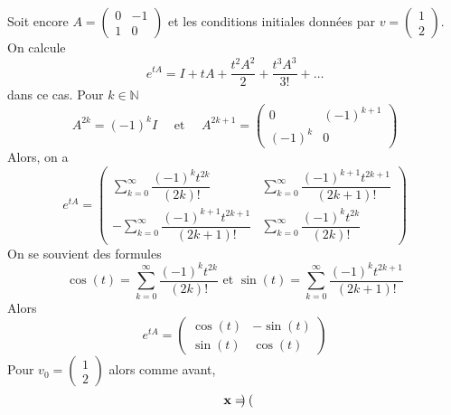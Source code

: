 \begin{example} 
  Soit encore 
  $A =
  \begin{pmatrix}
    0 & -1\\
    1 & 0
  \end{pmatrix}$ et les conditions initiales données par $v =  \left(\begin{smallmatrix}
    1\\2
  \end{smallmatrix}\right)$.
  On calcule 
  \begin{displaymath}
    e^{tA} =  I+tA+\dfrac{t^{2}A^{2}}{2}+\dfrac{t^{3}A^{3}}{3!}+\dots 
  \end{displaymath}
dans ce cas. 
Pour  $k∈ ℕ$ 
\begin{displaymath}
  A^{2k}=(-1)^{k} I  \quad \text{ et } \quad  A^{2k+1}=
\begin{pmatrix}
    0 & (-1)^{k+1}\\
    (-1)^{k} & 0
\end{pmatrix} 
\end{displaymath}
Alors, on a 
\begin{displaymath} 
  e^{tA} = 
  \begin{pmatrix} \displaystyle 
     \sum_{k=0}^{\infty}\dfrac{(-1)^{k}t^{2k}}{(2k)!} &  \displaystyle \sum_{k=0}^{\infty}\dfrac{(-1)^{k+1}t^{2k+1}}{(2k+1)!}\\
    \displaystyle - \sum_{k=0}^{\infty}\dfrac{(-1)^{k+1}t^{2k+1}}{(2k+1)!} & \displaystyle \sum_{k=0}^{\infty}\dfrac{(-1)^{k}t^{2k}}{(2k)!}
\end{pmatrix}
\end{displaymath}
On se souvient des formules 
\begin{displaymath}
  \cos(t) =\displaystyle \sum_{k=0}^{\infty}\dfrac{(-1)^{k}t^{2k}}{(2k)!} \text{ et }\sin(t) =\displaystyle \sum_{k=0}^{\infty}\dfrac{(-1)^{k}t^{2k+1}}{(2k+1)!} 
\end{displaymath}
Alors
\begin{displaymath}
  e^{tA} = \begin{pmatrix}
    \cos(t)&-\sin(t)\\
    \sin(t)&\cos(t)
  \end{pmatrix}
\end{displaymath}
Pour  $v_0 = 
\begin{pmatrix}
    1\\
    2
\end{pmatrix} $ 
alors comme avant, 
\begin{displaymath}
  \mathbf{x} = \begin{pmatrix}

\end{pmatrix}
\end{displaymath}
\end{example}
